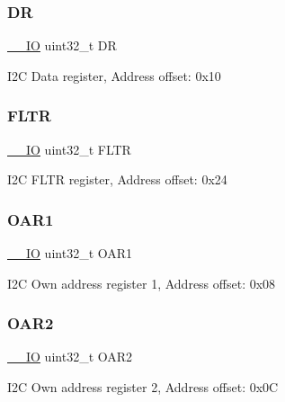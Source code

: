 \subsubsection{\texorpdfstring{DR}{DR}}
{\footnotesize\ttfamily \mbox{\hyperlink{core__sc300_8h_aec43007d9998a0a0e01faede4133d6be}{\+\_\+\+\_\+\+IO}} uint32\+\_\+t DR}

I2C Data register, Address offset\+: 0x10 \mbox{\label{struct_i2_c___type_def_aa23ced8246d69edb9261a8de1f1e253f}} 
\subsubsection{\texorpdfstring{F\+L\+TR}{FLTR}}
{\footnotesize\ttfamily \mbox{\hyperlink{core__sc300_8h_aec43007d9998a0a0e01faede4133d6be}{\+\_\+\+\_\+\+IO}} uint32\+\_\+t F\+L\+TR}

I2C F\+L\+TR register, Address offset\+: 0x24 \mbox{\label{struct_i2_c___type_def_a08b4be0d626a00f26bc295b379b3bba6}} 
\subsubsection{\texorpdfstring{O\+A\+R1}{OAR1}}
{\footnotesize\ttfamily \mbox{\hyperlink{core__sc300_8h_aec43007d9998a0a0e01faede4133d6be}{\+\_\+\+\_\+\+IO}} uint32\+\_\+t O\+A\+R1}

I2C Own address register 1, Address offset\+: 0x08 \mbox{\label{struct_i2_c___type_def_ab5c57ffed0351fa064038939a6c0bbf6}} 
\subsubsection{\texorpdfstring{O\+A\+R2}{OAR2}}
{\footnotesize\ttfamily \mbox{\hyperlink{core__sc300_8h_aec43007d9998a0a0e01faede4133d6be}{\+\_\+\+\_\+\+IO}} uint32\+\_\+t O\+A\+R2}

I2C Own address register 2, Address offset\+: 0x0C \mbox{\label{struct_i2_c___type_def_acefca4fd83c4b7846ae6d3cfe7bb8df9}} 
